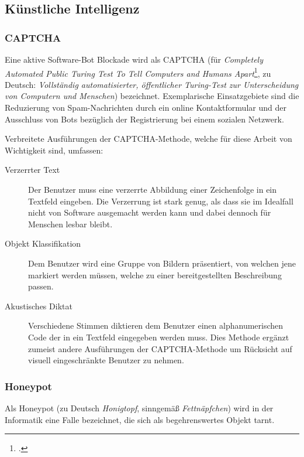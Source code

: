 \subsection{Künstliche Intelligenz} %
\label{sub:kunstliche_intelligenz}
\subsubsection{CAPTCHA} %
\label{ssub:captcha}
Eine aktive Software-Bot Blockade wird als CAPTCHA (für \emph{Completely
Automated Public Turing Test To Tell Computers and Humans
Apart}\footcite{captchaNet}, zu Deutsch: \emph{Vollständig
automatisierter, öffentlicher Turing-Test zur Unterscheidung von
Computern und Menschen}) bezeichnet. Exemplarische Einsatzgebiete sind
die Reduzierung von Spam-Nachrichten durch ein online Kontaktformular
und der Ausschluss von Bots bezüglich der Registrierung bei einem
sozialen Netzwerk.

Verbreitete Ausführungen der CAPTCHA-Methode, welche für diese Arbeit
von Wichtigkeit sind, umfassen:

\begin{description}
  \item[Verzerrter Text]
  Der Benutzer muss eine verzerrte Abbildung einer Zeichenfolge in ein
  Textfeld eingeben. Die Verzerrung ist stark genug, als dass sie im
  Idealfall nicht von Software ausgemacht werden kann und dabei dennoch
  für Menschen lesbar bleibt.
  
  \item[Objekt Klassifikation]
  Dem Benutzer wird eine Gruppe von Bildern präsentiert, von welchen jene
  markiert werden müssen, welche zu einer bereitgestellten Beschreibung
  passen.
  
  \item[Akustisches Diktat]
  Verschiedene Stimmen diktieren dem Benutzer einen alphanumerischen Code
  der in ein Textfeld eingegeben werden muss. Dies Methode ergänzt zumeist
  andere Ausführungen der CAPTCHA-Methode um Rücksicht auf visuell
eingeschränkte Benutzer zu nehmen.
\end{description}

\subsubsection{Honeypot} %
\label{ssub:honeypot}
Als Honeypot (zu Deutsch \emph{Honigtopf}, sinngemäß \emph{Fettnäpfchen}) wird in der Informatik eine Falle bezeichnet, die sich als begehrenswertes Objekt tarnt.

